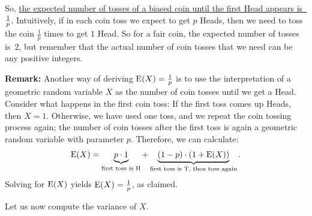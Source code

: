 \documentclass[11pt]{article}
\def\ul#1{\underline{#1}}
\def\Ex#1{{\rm E}(#1)}
\begin{document}
So, \ul{the expected number of tosses of a biased coin until the first
Head appears is~$1\over p$}. Intuitively, if in each coin toss we expect
to get $p$ Heads, then we need to toss the coin $\frac{1}{p}$ times to get
$1$ Head. So for a fair coin, the expected number of tosses is~2, but remember
that the actual number of coin tosses that we need can be any positive integers.

{\bf Remark:} Another way of deriving $\Ex{X} = \frac{1}{p}$ is to use the interpretation
of a geometric random variable $X$ as the number of coin tosses until we get a Head. Consider
what happens in the first coin toss: If the first toss comes up Heads, then $X = 1$. Otherwise,
we have used one toss, and we repeat the coin tossing process again; the number
of coin tosses after the first toss is again a geometric random variable with parameter
$p$. Therefore, we can calculate:
$$\Ex{X} = \underbrace{p \cdot 1}_{\text{first toss is H}} + \underbrace{(1-p) \cdot (1 + \Ex{X})}_{\text{first toss is T, then toss again}}.$$
Solving for $\Ex{X}$ yields $\Ex{X} = \frac{1}{p}$, as claimed.

Let us now compute the variance of $X$.
\end{document}

